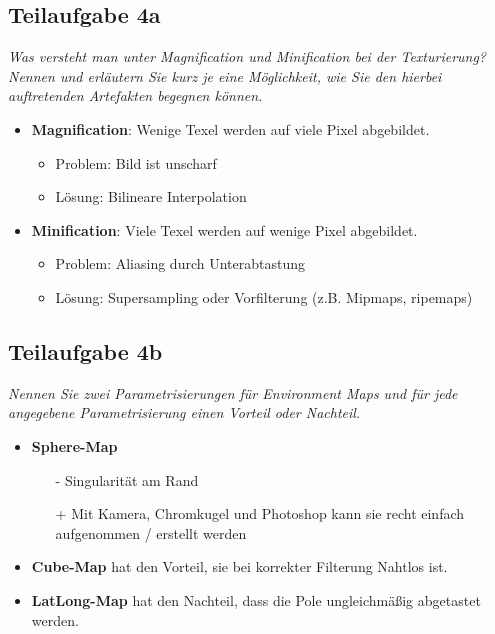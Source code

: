 \documentclass[a4paper]{scrartcl}
\begin{document}
\subsection*{Teilaufgabe 4a}
\textit{Was versteht man unter Magnification und Minification bei der Texturierung? Nennen
und erläutern Sie kurz je eine Möglichkeit, wie Sie den hierbei auftretenden Artefakten
begegnen können.}

\begin{itemize}
    \item \textbf{Magnification}: Wenige Texel werden auf viele Pixel abgebildet.
    \begin{itemize}
        \item Problem: Bild ist unscharf
        \item Lösung: Bilineare Interpolation
    \end{itemize}
    \item \textbf{Minification}: Viele Texel werden auf wenige Pixel abgebildet.
    \begin{itemize}
        \item Problem: Aliasing durch Unterabtastung
        \item Lösung: Supersampling oder Vorfilterung (z.B. Mipmaps, ripemaps)
    \end{itemize}
\end{itemize}

\subsection*{Teilaufgabe 4b}
\textit{Nennen Sie zwei Parametrisierungen für Environment Maps und für jede angegebene
Parametrisierung einen Vorteil oder Nachteil.}\\
\begin{itemize}
    \item \textbf{Sphere-Map}
    \begin{itemize}
        \item[-] Singularität am Rand
        \item[+] Mit Kamera, Chromkugel und Photoshop kann sie recht einfach
                 aufgenommen / erstellt werden
    \end{itemize}
    \item \textbf{Cube-Map} hat den Vorteil, sie bei korrekter Filterung
          Nahtlos ist.
    \item \textbf{LatLong-Map} hat den Nachteil, dass die Pole ungleichmäßig
          abgetastet werden.
\end{itemize}
\end{document}

